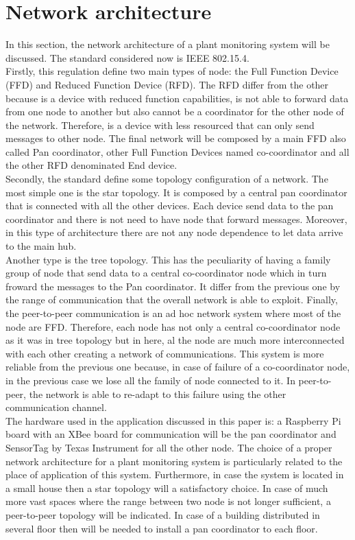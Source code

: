 \section{Network architecture}
In this section, the network architecture of a plant monitoring system will be discussed. The standard considered now is IEEE 802.15.4.\\
 Firstly, this regulation define two main types of node: the Full Function Device (FFD) and Reduced Function Device (RFD). The RFD differ from the other because is a device with reduced function capabilities, is not able to forward data from one node to another but also cannot be a coordinator for the other node of the network. Therefore, is a device with less resourced that can only send messages to other node. The final network will be composed by a main FFD also called Pan coordinator, other Full Function Devices named co-coordinator and all the other RFD denominated End device. \cite{802-15-4} \\
 Secondly, the standard define some topology configuration of a network. The most simple one is the star topology. It is composed by a central pan coordinator that is connected with all the other devices. Each device send data to the pan coordinator and there is not need to have node that forward messages. Moreover, in this type of architecture there are not any node dependence to let data arrive to the main hub.\\
 Another type is the tree topology. This has the peculiarity of having a family group of node that send data to a central co-coordinator node which in turn froward the messages to the Pan coordinator. It differ from the previous one by the range of communication that the overall network is able to exploit.
 Finally, the peer-to-peer communication is an ad hoc network system where most of the node are FFD. Therefore, each node has not only a central co-coordinator node as it was in tree topology but in here, al the node are much more interconnected with each other creating a network of communications. This system is more reliable from the previous one because, in case of failure of a co-coordinator node, in the previous case we lose all the family of node connected to it. In peer-to-peer, the network is able to re-adapt to this failure using the other communication channel. \cite{slide}\\
 The hardware used in the application discussed in this paper is: a Raspberry Pi board with an XBee board for communication will be the pan coordinator and SensorTag by Texas Instrument for all the other node. The choice of a proper network architecture for a plant monitoring system is particularly related to the place of application of this system. Furthermore, in case the system is located in a small house then a star topology will a satisfactory choice. In case of much more vast spaces where the range between two node is not longer sufficient, a peer-to-peer topology will be indicated. In case of a building distributed in several floor then will be needed to install a pan coordinator to each floor.\\

